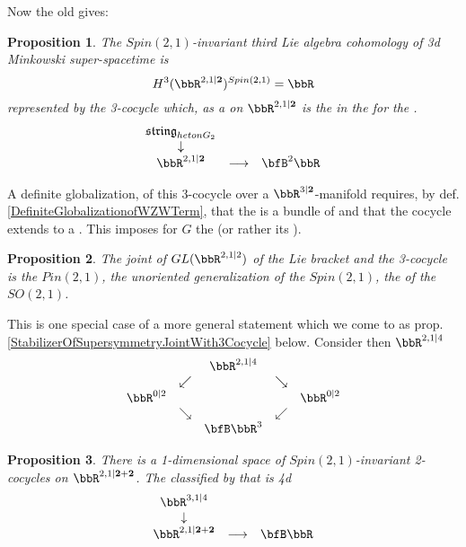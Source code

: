 \documentclass[12pt,titlepage]{article}
\newcommand{\itexarray}[1]{\begin{matrix}#1\end{matrix}}
\theoremstyle{plain}
\newtheorem{prop}{Proposition}
\theoremstyle{definition}
\theoremstyle{remark}
\begin{document}
Now the old  gives:
\begin{prop}
\label{}\hypertarget{}{}
The $Spin(2,1)$-invariant third Lie algebra cohomology of 3d Minkowski super-spacetime is
\begin{displaymath}
H^3(\bbR^{2,1\vert \mathbf{2}})^{Spin(2,1)} = \bbR
\end{displaymath}
represented by the 3-cocycle which, as a   on $\bbR^{2,1\vert \mathbf{2}}$ is the  in the  for the .
\begin{displaymath}
\itexarray{
\mathfrak{string}_{het  on  G_2}
\\
\downarrow
\\
\bbR^{2,1\vert \mathbf{2}}
&\stackrel{}{\longrightarrow}&
\bfB^2 \bbR
}
\end{displaymath}
\end{prop}
A definite globalization, of this 3-cocycle over a $\bbR^{3\vert \mathbf{2}}$-manifold requires, by def. \ref{DefiniteGlobalizationofWZWTerm}, that the  is a bundle of  and that the cocycle extends to a . This imposes  for $G$ the  (or rather its  ).
\begin{prop}
\label{}\hypertarget{}{}
The joint  of $GL(\bbR^{2,1\vert 2})$ of the Lie bracket and the 3-cocycle is the  $Pin(2,1)$, the unoriented generalization of the  $Spin(2,1)$, the  of the  $SO(2,1)$.
\end{prop}
This is one special case of a more general statement which we come to as prop. \ref{StabilizerOfSupersymmetryJointWith3Cocycle} below.
Consider then $\bbR^{2,1\vert 4}$
\begin{displaymath}
\itexarray{
&& \bbR^{2,1\vert 4}
\\
& \swarrow && \searrow
\\
\bbR^{0 \vert 2} && && \bbR^{0\vert 2}
\\
& \searrow && \swarrow
\\
&& \bfB \bbR^3
}
\end{displaymath}
\begin{prop}
\label{4dSuperMinkowskiSpacetime}\hypertarget{4dSuperMinkowskiSpacetime}{}
There is a 1-dimensional space of $Spin(2,1)$-invariant 2-cocycles on $\bbR^{2,1\vert \mathbf{2} + \mathbf{2}}$. The  classified by that is 4d 
\begin{displaymath}
\itexarray{
\bbR^{3,1\vert 4}
\\
\downarrow
\\
\bbR^{2,1\vert \mathbf{2}+{\mathbf{2}}}
&\longrightarrow&
\bfB\bbR
}
\end{displaymath}
\end{prop}
\end{document}
